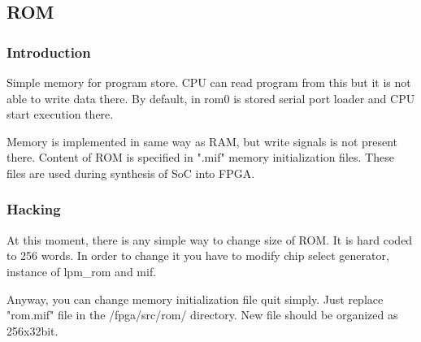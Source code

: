 \subsection{ROM}

\subsubsection{Introduction}

Simple memory for program store. CPU can read program from this but it is not
able to write data there. By default, in rom0 is stored serial port loader and
CPU start execution there.

Memory is implemented in same way as RAM, but write signals is not present
there. Content of ROM is specified in ".mif" memory initialization files. These
files are used during synthesis of SoC into FPGA.

\subsubsection{Hacking}

At this moment, there is any simple way to change size of ROM. It is hard coded
to 256 words. In order to change it you have to modify chip select generator,
instance of lpm\_rom and mif.

Anyway, you can change memory initialization file quit simply. Just replace
"rom.mif" file in the /fpga/src/rom/ directory. New file should be organized
as 256x32bit.
